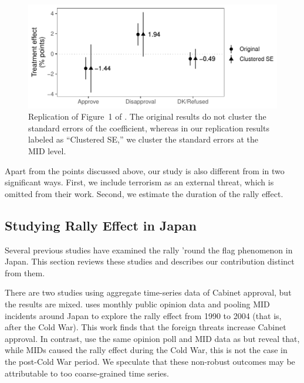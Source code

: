 \documentclass[12pt,letterpaper]{scrartcl}
\begin{document}
\begin{figure}[!ht]
  \includegraphics[width = \linewidth]{Figure_POQ/Figure_1_revised.pdf}
  \caption{Replication of Figure~1 of \citet{seo2023}. The original results do not cluster the standard errors of the coefficient, whereas in our replication results labeled as ``Clustered SE,'' we cluster the standard errors at the MID level.}\label{app:fig:replication}
\end{figure}

Apart from the points discussed above, our study is also different from \citet{seo2023} in two significant ways. First, we include terrorism as an external threat, which is omitted from their work. Second, we estimate the duration of the rally effect.

\subsection{Studying Rally Effect in Japan}\label{app:subsec:rally_japan}

Several previous studies have examined the rally 'round the flag phenomenon in Japan. This section reviews these studies and describes our contribution distinct from them.

There are two studies using aggregate time-series data of Cabinet approval, but the results are mixed. \citet{kagotani2015} uses monthly public opinion data and pooling MID incidents around Japan to explore the rally effect from 1990 to 2004 (that is, after the Cold War). This work finds that the foreign threats increase Cabinet approval. In contrast, \citet{Ohmura2014Leviathan} use the same opinion poll and MID data as \citet{kagotani2015} but reveal that, while MIDs caused the rally effect during the Cold War, this is not the case in the post-Cold War period. We speculate that these non-robust outcomes may be attributable to too coarse‐grained time series.
\end{document}
